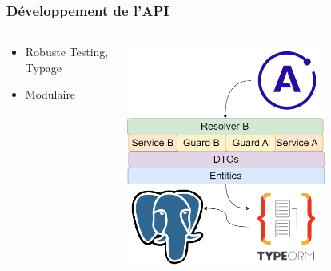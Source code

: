 \documentclass[aspectratio=169]{beamer}
\begin{document}
    \begin{frame}
        \frametitle{Développement de l'API}
        \begin{columns}
            \begin{column}{0.5\textwidth}
                \begin{itemize}
                    \item Robuste Testing, Typage
                    \item Modulaire
                \end{itemize}
            \end{column}

            \begin{column}{0.5\textwidth}
                \begin{flushleft}
                    \includegraphics[width=0.7\textwidth]{imgs/module}\label{fig:figure4}
                \end{flushleft}
            \end{column}
        \end{columns}

    \end{frame}
\end{document}
